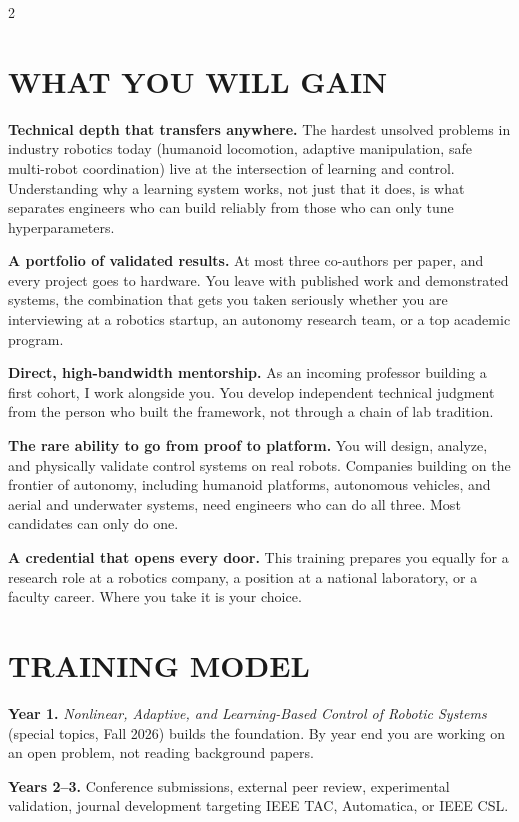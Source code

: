 \documentclass[9pt, letterpaper]{article}
\begin{document}
\begin{multicols}{2}

\section{WHAT YOU WILL GAIN}

\textbf{Technical depth that transfers anywhere.}
The hardest unsolved problems in industry robotics today (humanoid locomotion,
adaptive manipulation, safe multi-robot coordination) live at the intersection
of learning and control.
Understanding why a learning system works, not just that it does, is what separates
engineers who can build reliably from those who can only tune hyperparameters.

\textbf{A portfolio of validated results.}
At most three co-authors per paper, and every project goes to hardware.
You leave with published work and demonstrated systems, the combination that
gets you taken seriously whether you are interviewing at a robotics startup,
an autonomy research team, or a top academic program.

\textbf{Direct, high-bandwidth mentorship.}
As an incoming professor building a first cohort, I work alongside you.
You develop independent technical judgment from the person who built the framework,
not through a chain of lab tradition.

\textbf{The rare ability to go from proof to platform.}
You will design, analyze, and physically validate control systems on real robots.
Companies building on the frontier of autonomy, including humanoid platforms,
autonomous vehicles, and aerial and underwater systems, need engineers who can do all three.
Most candidates can only do one.

\textbf{A credential that opens every door.}
This training prepares you equally for a research role at a robotics company,
a position at a national laboratory, or a faculty career.
Where you take it is your choice.

\columnbreak

\section{TRAINING MODEL}

\textbf{Year 1.}
\textit{Nonlinear, Adaptive, and Learning-Based Control of Robotic Systems}
(special topics, Fall 2026) builds the foundation.
By year end you are working on an open problem, not reading background papers.

\textbf{Years 2--3.}
Conference submissions, external peer review, experimental validation,
journal development targeting IEEE TAC, Automatica, or IEEE CSL.


\end{multicols}
\end{document}
